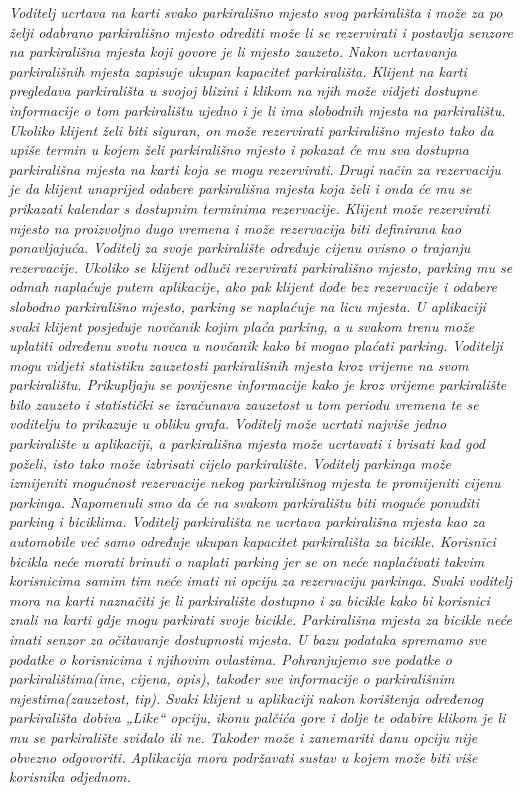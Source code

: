 \textit{Voditelj ucrtava na karti svako parkirališno mjesto svog parkirališta i može za po želji odabrano parkirališno mjesto odrediti može li se rezervirati i postavlja senzore na parkirališna mjesta koji govore je li mjesto zauzeto. Nakon ucrtavanja parkirališnih mjesta zapisuje ukupan kapacitet parkirališta.
Klijent na karti pregledava parkirališta u svojoj blizini i klikom na njih može vidjeti dostupne informacije o tom parkiralištu ujedno i je li ima slobodnih mjesta na parkiralištu. Ukoliko klijent želi biti siguran, on može rezervirati parkirališno mjesto tako da upiše termin u kojem želi parkirališno mjesto i pokazat će mu sva dostupna parkirališna mjesta na karti koja se mogu rezervirati. Drugi način za rezervaciju je da klijent unaprijed odabere parkirališna mjesta koja želi i onda će mu se prikazati kalendar s dostupnim terminima rezervacije. Klijent može rezervirati mjesto na proizvoljno dugo vremena i može rezervacija biti definirana kao ponavljajuća. Voditelj za svoje parkiralište određuje cijenu ovisno o trajanju rezervacije. Ukoliko se klijent odluči rezervirati parkirališno mjesto, parking mu se odmah naplaćuje putem aplikacije, ako pak klijent dođe bez rezervacije i odabere slobodno parkirališno mjesto, parking se naplaćuje na licu mjesta. U aplikaciji svaki klijent posjeduje novčanik kojim plaća parking, a u svakom trenu može uplatiti određenu svotu novca u novčanik kako bi mogao plaćati parking.
Voditelji mogu vidjeti statistiku zauzetosti parkirališnih mjesta kroz vrijeme na svom parkiralištu. Prikupljaju se povijesne informacije kako je kroz vrijeme parkiralište bilo zauzeto i statistički se izračunava zauzetost u tom periodu vremena te se voditelju to prikazuje u obliku grafa. Voditelj može ucrtati najviše jedno parkiralište u aplikaciji, a parkirališna mjesta može ucrtavati i brisati kad god poželi, isto tako može izbrisati cijelo parkiralište. Voditelj parkinga može izmijeniti mogućnost rezervacije nekog parkirališnog mjesta te promijeniti cijenu parkinga. 
Napomenuli smo da će na svakom parkiralištu biti moguće ponuditi parking i biciklima. Voditelj parkirališta ne ucrtava parkirališna mjesta kao za automobile već samo određuje ukupan kapacitet parkirališta za bicikle. Korisnici bicikla neće morati brinuti o naplati parking jer se on neće naplaćivati takvim korisnicima samim tim neće imati ni opciju za rezervaciju parkinga. Svaki voditelj mora na karti naznačiti je li parkiralište dostupno i za bicikle kako bi korisnici znali na karti gdje mogu parkirati svoje bicikle. Parkirališna mjesta za bicikle neće imati senzor za očitavanje dostupnosti mjesta. U bazu podataka spremamo sve podatke o korisnicima i njihovim ovlastima. Pohranjujemo sve podatke o parkiralištima(ime, cijena, opis), također sve informacije o parkirališnim mjestima(zauzetost, tip). Svaki klijent u aplikaciji nakon korištenja određenog parkirališta dobiva „Like“ opciju, ikonu palčića gore  i dolje te odabire klikom je li mu se parkiralište sviđalo ili ne. Također može i zanemariti danu opciju nije obvezno odgovoriti. Aplikacija mora podržavati sustav u kojem može biti više korisnika odjednom.
}

